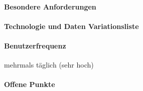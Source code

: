 \paragraph{Besondere Anforderungen}

\paragraph{Technologie und Daten Variationsliste}

\paragraph{Benutzerfrequenz}
mehrmals täglich (sehr hoch)

\paragraph{Offene Punkte}


\newpage
